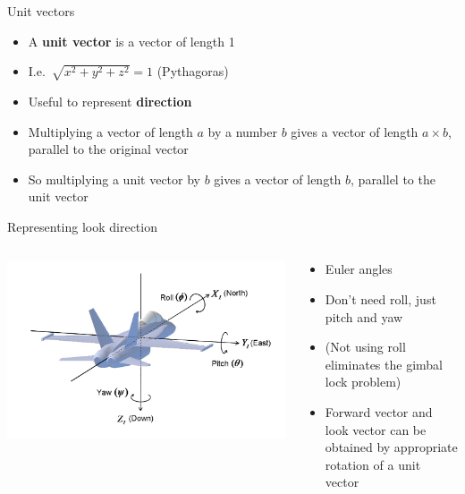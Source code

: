 \begin{frame}{Unit vectors}
	\begin{itemize}
		\pause\item A \textbf{unit vector} is a vector of length 1
		\pause\item I.e.\ $\sqrt{x^2 + y^2 + z^2} = 1$ (Pythagoras)
		\pause\item Useful to represent \textbf{direction}
		\pause\item Multiplying a vector of length $a$ by a number $b$ gives a vector of length $a \times b$,
			parallel to the original vector
		\pause\item So multiplying a unit vector by $b$ gives a vector of length $b$,
			parallel to the unit vector		
	\end{itemize}
\end{frame}

\begin{frame}{Representing look direction}
	\begin{columns}
		\pause
		\begin{column}{0.48\textwidth}
			\includegraphics[width=\textwidth]{../03/euler_aeroplane}
		\end{column}
		\begin{column}{0.48\textwidth}
			\begin{itemize}
				\pause\item Euler angles
				\pause\item Don't need roll, just pitch and yaw
				\pause\item (Not using roll eliminates the gimbal lock problem)
				\pause\item Forward vector and look vector can be obtained by appropriate rotation of a unit vector
			\end{itemize}
		\end{column}
	\end{columns}
\end{frame}
